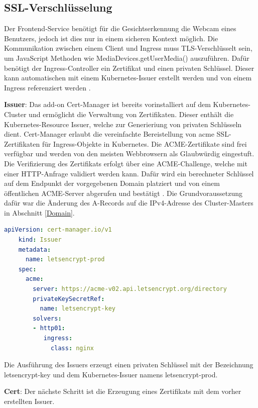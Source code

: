 \subsection{SSL-Verschlüsselung}

Der Frontend-Service benötigt für die Gesichtserkennung die Webcam eines Benutzers, jedoch ist dies nur in einem sicheren Kontext möglich.
Die Kommunikation zwischen einem Client und Ingress muss TLS-Verschlüsselt sein, um JavaScript Methoden wie MediaDevices.getUserMedia() auszuführen.
Dafür benötigt der Ingress-Controller ein Zertifikat und einen privaten Schlüssel.
Dieser kann automatischen mit einem Kubernetes-Issuer erstellt werden und von einem Ingress referenziert werden \cite{certmanager}.

\textbf{Issuer}: 
Das add-on Cert-Manager ist bereits vorinstalliert auf dem Kubernetes-Cluster und ermöglicht die Verwaltung von Zertifikaten.
Dieser enthält die Kubernetes-Resource Issuer, welche zur Generieriung von privaten Schlüsseln dient.
Cert-Manager erlaubt die vereinfachte Bereistellung von \ac*{acme} SSL-Zertifikaten für Ingress-Objekte in Kubernetes.
Die ACME-Zertifikate sind frei verfügbar und werden von den meisten Webbrowsern als Glaubwürdig eingestuft.
Die Verifizierung des Zertifikats erfolgt über eine ACME-Challenge, welche mit einer HTTP-Anfrage validiert werden kann.
Dafür wird ein berechneter Schlüssel auf dem Endpunkt der vorgegebenen Domain platziert und von einem öffentlichen ACME-Server abgerufen und bestätigt \cite{certmanageracme}.
Die Grundvoraussetzung dafür war die Änderung des A-Records auf die IPv4-Adresse des Cluster-Masters in Abschnitt \ref{Domain}.


\begin{lstlisting}[caption={issuer.yaml \cite{certmanageracme} },captionpos=b,label={lst:issuer},language=yaml]
    apiVersion: cert-manager.io/v1
    kind: Issuer
    metadata:
      name: letsencrypt-prod
    spec:
      acme:
        server: https://acme-v02.api.letsencrypt.org/directory
        privateKeySecretRef:
          name: letsencrypt-key
        solvers:
        - http01:
           ingress:
             class: nginx

\end{lstlisting}

Die Ausführung des Issuers erzeugt einen privaten Schlüssel mit der Bezeichnung letsencrypt-key und dem Kubernetes-Issuer namens letsencrypt-prod.  


\textbf{Cert}: 
Der nächste Schritt ist die Erzeugung eines Zertifikats mit dem vorher erstellten Issuer.

